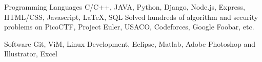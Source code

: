 

\begin{cvskills}

  \cvskill
    {Programming Languages} %
    {C/C++, JAVA, Python, Django, Node.js, Express, HTML/CSS, Javascript, LaTeX, SQL \newline
    Solved hundreds of algorithm and security problems on PicoCTF, Project Euler, USACO, Codeforces, Google Foobar, etc.} %

 \cvskill
    {Software} %
    {Git, ViM, Linux Development, Eclipse, Matlab, Adobe Photoshop and Illustrator, Excel} %

%
%
%
%



\end{cvskills}
